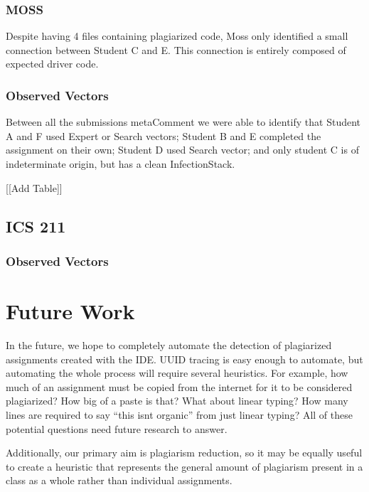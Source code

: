 \documentclass[conference]{IEEEtran}
\newcommand{\n}{\hfill\break}
\newcommand{\metaComment}{metaComment\xspace}
\newcommand{\infectionStack}{InfectionStack\xspace}
\begin{document}
\n\subsubsection*{\textbf{MOSS}}\hfill\break\indent
Despite having 4 files containing plagiarized code, Moss only identified a small connection between Student C and E.  This connection is entirely composed of expected driver code. 
\n\subsubsection*{\textbf{Observed Vectors}}\hfill\break\indent
Between all the submissions \metaComment we were able to identify that Student A and F used Expert or Search vectors; Student B and E completed the assignment on their own; Student D used Search vector; and only student C is of indeterminate origin, but has a clean \infectionStack.

[[Add Table]]
\subsection*{\textbf{ICS 211}}

\n\subsubsection*{\textbf{Observed Vectors}}\hfill\break\indent

\n\section{\textbf{Future Work}}
In the future, we hope to completely automate the detection of plagiarized assignments created with the IDE.  UUID tracing is easy enough to automate, but automating the whole process will require several heuristics.  For example, how much of an assignment must be copied from the internet for it to be considered plagiarized?  How big of a paste is that?  What about linear typing?  How many lines are required to say ``this isnt organic'' from just linear typing?  All of these potential questions need future research to answer.  

Additionally, our primary aim is plagiarism reduction, so it may be equally useful to create a heuristic that represents the general amount of plagiarism present in a class as a whole rather than individual assignments. 
\end{document}
